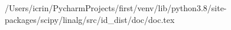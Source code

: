 /Users/icrin/PycharmProjects/first/venv/lib/python3.8/site-packages/scipy/linalg/src/id_dist/doc/doc.tex